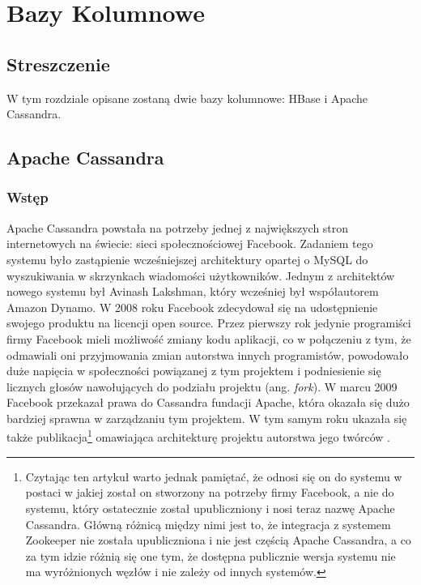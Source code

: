 \chapter{Bazy Kolumnowe}

\section*{Streszczenie}
W tym rozdziale opisane zostaną dwie bazy kolumnowe: HBase i Apache Cassandra.

\section{Apache Cassandra}
\label{sec:cassandra}

\subsection*{Wstęp}

Apache Cassandra powstała na potrzeby jednej z największych stron internetowych na świecie: sieci społecznościowej Facebook. 
Zadaniem tego systemu było zastąpienie wcześniejszej architektury opartej o MySQL do wyszukiwania w skrzynkach wiadomości użytkowników.
Jednym z architektów nowego systemu był Avinash Lakshman, który wcześniej był współautorem Amazon Dynamo.
W 2008 roku Facebook zdecydował się na udostępnienie swojego produktu na licencji open source.
Przez pierwszy rok jedynie programiści firmy Facebook mieli możliwość zmiany kodu aplikacji, co w połączeniu z tym, że odmawiali oni przyjmowania zmian autorstwa innych programistów, powodowało duże napięcia w społeczności powiązanej z tym projektem i podniesienie się licznych głosów nawołujących do podziału projektu (ang. \emph{fork}).
W marcu 2009 Facebook przekazał prawa do Cassandra fundacji Apache, która okazała się dużo bardziej sprawna w zarządzaniu tym projektem\cite{evans-cassandra}.
W tym samym roku ukazała się także publikacja\footnote{Czytając ten artykuł warto jednak pamiętać, że odnosi się on do systemu w postaci w jakiej został on stworzony na potrzeby firmy Facebook, a nie do systemu, który ostatecznie został upubliczniony i nosi teraz nazwę Apache Cassandra. Główną różnicą między nimi jest to, że integracja z systemem Zookeeper nie została upubliczniona i nie jest częścią Apache Cassandra, a co za tym idzie różnią się one tym, że dostępna publicznie wersja systemu nie ma wyróżnionych węzłów i nie zależy od innych systemów.} omawiająca architekturę projektu autorstwa jego twórców \cite{cassandra-paper}.

